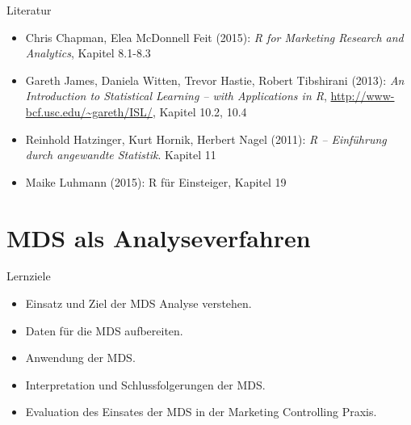 \documentclass[12pt,ngerman,a4paper,ignorenonframetext,]{beamer}
\providecommand{\tightlist}{%
  \setlength{\itemsep}{0pt}\setlength{\parskip}{0pt}}
\begin{document}
\begin{frame}{Literatur}
\protect\hypertarget{literatur-1}{}

\begin{itemize}
\tightlist
\item
  Chris Chapman, Elea McDonnell Feit (2015): \emph{R for Marketing
  Research and Analytics}, Kapitel 8.1-8.3
\item
  Gareth James, Daniela Witten, Trevor Hastie, Robert Tibshirani (2013):
  \emph{An Introduction to Statistical Learning -- with Applications in
  R}, \url{http://www-bcf.usc.edu/~gareth/ISL/}, Kapitel 10.2, 10.4
\item
  Reinhold Hatzinger, Kurt Hornik, Herbert Nagel (2011): \emph{R --
  Einführung durch angewandte Statistik}. Kapitel 11
\item
  Maike Luhmann (2015): R für Einsteiger, Kapitel 19
\end{itemize}

\end{frame}

\hypertarget{mds-als-analyseverfahren}{%
\section{MDS als Analyseverfahren}\label{mds-als-analyseverfahren}}

\begin{frame}{Lernziele}
\protect\hypertarget{lernziele-5}{}

\begin{itemize}
\tightlist
\item
  Einsatz und Ziel der MDS Analyse verstehen.
\item
  Daten für die MDS aufbereiten.
\item
  Anwendung der MDS.
\item
  Interpretation und Schlussfolgerungen der MDS.
\item
  Evaluation des Einsates der MDS in der Marketing Controlling Praxis.
\end{itemize}

\end{frame}
\end{document}
